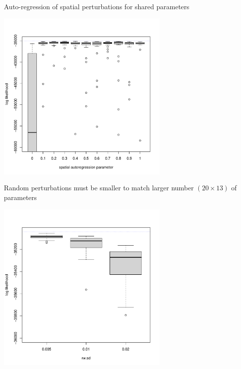 \documentclass{beamer}
\begin{document}
    
\begin{frame}{Auto-regression of spatial perturbations for shared parameters}

\vspace{-10mm}

\begin{center}
\includegraphics[width=8.5cm]{ibpf/boxplot-spat-reg.pdf}

\end{center}

\vspace{-2mm}
  
\end{frame}

\begin{frame}{Random perturbations must be smaller to match larger number  $(20\times 13)$ of parameters}
    
\vspace{-10mm}

\begin{center}
\includegraphics[width=8.5cm]{ibpf/boxplot-rw-sd.pdf}

\end{center}

\vspace{-2mm}
  
\end{frame}
\end{document}
